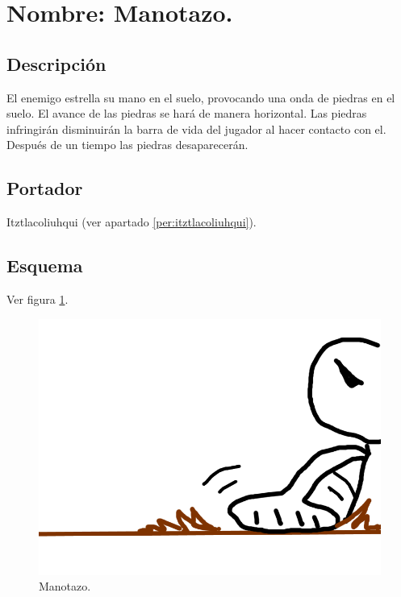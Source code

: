 \section{Nombre: Manotazo.} \label{hab.Manotazo}
\subsection{Descripción}
El enemigo estrella su mano en el suelo, provocando una onda de piedras en el suelo. El avance de las piedras se hará de manera horizontal. Las piedras infringirán disminuirán la barra de vida del jugador al hacer contacto con el. Después de un tiempo las piedras desaparecerán.
\subsection{Portador}
Itztlacoliuhqui (ver apartado \ref{per:itztlacoliuhqui}).
\subsection{Esquema}
			Ver figura \ref{fig:manotazo}.
			\begin{figure}
				\centering
				\includegraphics[height=0.2 \textheight]{Imagenes/manotazo}
				\caption{Manotazo.}
				\label{fig:manotazo}
			\end{figure}